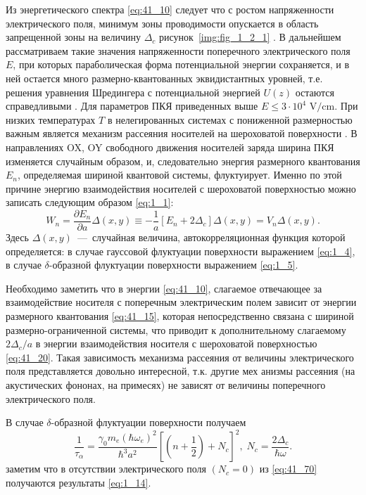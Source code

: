 Из энергетического спектра \eqref{eq:41_10} следует что с ростом напряженности электрического поля, минимум зоны проводимости опускается в область запрещенной зоны на величину $\Delta _{c} $ рисунок~\ref{img:fig_1_2_1} . В дальнейшем рассматриваем такие значения напряженности поперечного электрического поля $E$, при которых параболическая форма потенциальной энергии сохраняется, и в ней остается много размерно-квантованных эквидистантных уровней, т.е. решения уравнения Шредингера с потенциальной энергией $U(z)$ остаются справедливыми \cite{Kanarovskii1995}. Для параметров ПКЯ приведенных выше $E\le 3\cdot 10^4\text{ V/cm}$. При низких температурах $T$ в нелегированных системах с пониженной размерностью важным является механизм рассеяния носителей на шероховатой поверхности \cite{Sakaki1987,Vurgaftman1999}. В направлениях OX, OY свободного движения носителей заряда ширина ПКЯ изменяется случайным образом, и, следовательно энергия размерного квантования $E_n$, определяемая шириной квантовой системы, флуктуирует. Именно по этой причине энергию взаимодействия носителей с шероховатой поверхностью можно записать следующим образом \eqref{eq:1_1}:
\begin{equation} \label{eq:41_20}
W_{n} =\frac{\partial E_n }{\partial a} \Delta(x,y) \equiv -\frac{1}{a} \left[ E_n +2\Delta_c \right] \Delta (x,y)=V_n \Delta (x,y).
\end{equation}
Здесь $\Delta (x,y)$~---~случайная величина, автокорреляционная функция которой определяется: в случае гауссовой флуктуации поверхности выражением \eqref{eq:1_4}, в случае $\delta$-образной флуктуации поверхности выражением \eqref{eq:1_5}.

Необходимо заметить что в энергии \eqref{eq:41_10}, слагаемое отвечающее за взаимодействие носителя с поперечным электрическим полем зависит от энергии размерного квантования \eqref{eq:41_15}, которая непосредственно связана с шириной размерно-ограниченной системы, что приводит к дополнительному слагаемому $2\Delta_c / a$ в энергии взаимодействия носителя с шероховатой поверхностью \eqref{eq:41_20}. Такая зависимость механизма рассеяния от величины электрического поля представляется довольно интересной, т.к. другие мех анизмы рассеяния (на акустических фононах, на примесях) не зависят от величины поперечного электрического поля.

В случае $\delta $-образной флуктуации поверхности получаем
\begin{equation} \label{eq:41_70}
\frac{1}{\tau _{\alpha } } =\frac{\gamma_0 m_e (\hbar\omega_e)^2 }{\hbar^3 a^2 } \left[\left(n+\frac{1}{2} \right)+N_c \right]^2, \;
N_c =\frac{2\Delta_c }{\hbar \omega } .
\end{equation}  
заметим что в отсутствии электрического поля $(N_c = 0)$ из \eqref{eq:41_70} получаются результаты \eqref{eq:1_14}.

